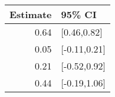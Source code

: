 \begin{tabular}{rl}
  \hline
Estimate & 95\% CI \\ 
  \hline
0.64 & [0.46,0.82] \\ 
  0.05 & [-0.11,0.21] \\ 
  0.21 & [-0.52,0.92] \\ 
  0.44 & [-0.19,1.06] \\ 
   \hline
\end{tabular}

